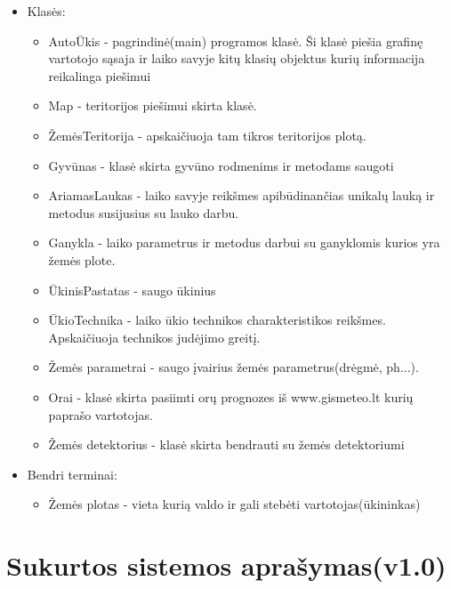 \documentclass[oneside]{VUMIFPSkursinis}
\begin{document}
\begin{itemize}
	\item Klasės:
		\begin{itemize}
			\item AutoŪkis - pagrindinė(main) programos klasė. Ši klasė piešia grafinę vartotojo sąsaja ir laiko savyje kitų klasių objektus kurių informacija reikalinga piešimui
			\item Map - teritorijos piešimui skirta klasė.
			\item ŽemėsTeritorija - apskaičiuoja tam tikros teritorijos plotą.
 			\item Gyvūnas - klasė skirta gyvūno rodmenims ir metodams saugoti
			\item AriamasLaukas - laiko savyje reikšmes apibūdinančias unikalų lauką ir metodus susijusius su lauko darbu.
			\item Ganykla - laiko parametrus ir metodus darbui su ganyklomis kurios yra žemės plote.
			\item ŪkinisPastatas - saugo ūkinius 
			\item ŪkioTechnika - laiko ūkio technikos charakteristikos reikšmes. Apskaičiuoja technikos judėjimo greitį.
			\item Žemės parametrai - saugo įvairius žemės parametrus(drėgmė, ph...).
			\item Orai - klasė skirta pasiimti orų prognozes iš www.gismeteo.lt kurių paprašo vartotojas.
			\item Žemės detektorius - klasė skirta bendrauti su žemės detektoriumi

		\end{itemize}
	\item Bendri terminai:
		\begin{itemize}
			\item Žemės plotas - vieta kurią valdo ir gali stebėti vartotojas(ūkininkas) 
		\end{itemize}
\end{itemize}

\section{Sukurtos sistemos aprašymas(v1.0)}
\end{document}
